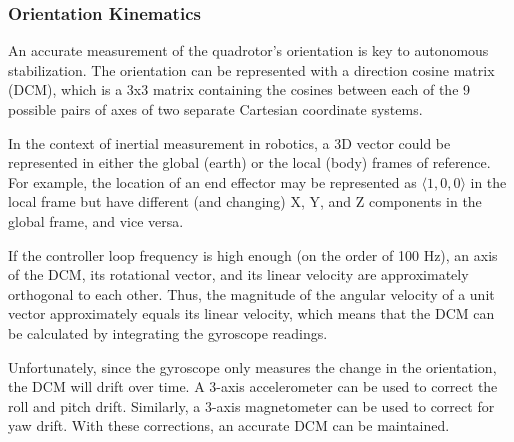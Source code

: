 \documentclass[12pt,letterpaper]{article}
\begin{document}
\subsubsection*{Orientation Kinematics}

An accurate measurement of the quadrotor's orientation is key to autonomous
stabilization. The orientation can be represented with a direction cosine
matrix (DCM), which is a 3x3 matrix containing the cosines between each of the
9 possible pairs of axes of two separate Cartesian coordinate systems.

In the context of inertial measurement in robotics, a 3D vector could be
represented in either the global (earth) or the local (body) frames of
reference. For example, the location of an end effector may be represented as
$\langle1, 0, 0\rangle$ in the local frame but have different (and changing) X,
Y, and Z components in the global frame, and vice versa.

If the controller loop frequency is high enough (on the order of 100 Hz), an
axis of the DCM, its rotational vector, and its linear velocity are
approximately orthogonal to each other. Thus, the magnitude of the angular
velocity of a unit vector approximately equals its linear velocity, which means
that the DCM can be calculated by integrating the gyroscope readings.

Unfortunately, since the gyroscope only measures the change in the orientation,
the DCM will drift over time. A 3-axis accelerometer can be used to correct the
roll and pitch drift. Similarly, a 3-axis magnetometer can be used to correct
for yaw drift. With these corrections, an accurate DCM can be maintained.



\end{document}
